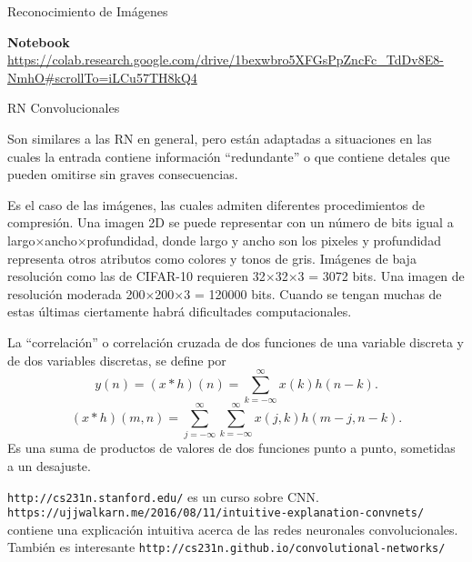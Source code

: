 \documentclass[10pd,hyperref={colorlinks=true}]{beamer}
\begin{document}

\begin{frame}{Reconocimiento de Im\'agenes}

 \vfill

\centerline{\textbf{Notebook} \url{https://colab.research.google.com/drive/1bexwbro5XFGsPpZncFc\_TdDv8E8-NmhO\#scrollTo=iLCu57TH8kQ4}}

 \vfill

 \end{frame}


 \begin{frame}{RN Convolucionales}

Son similares a las RN en general, pero est\'an adaptadas a situaciones 
en las cuales la entrada contiene informaci\'on ``redundante'' o que 
contiene detales que pueden omitirse sin graves consecuencias.

Es el caso de las im\'agenes, las cuales admiten diferentes 
procedimientos de compresi\'on. Una imagen 2D se puede representar con 
un n\'umero de bits igual a largo$\times$ancho$\times$profundidad, donde 
largo y ancho son los pixeles y profundidad representa otros atributos 
como colores y tonos de gris. Im\'agenes de baja resoluci\'on como las 
de CIFAR-10 requieren 32$\times$32$\times$3 = 3072 bits. Una imagen de 
resoluci\'on moderada 200$\times$200$\times$3 = 120000 bits. Cuando se 
tengan muchas de estas \'ultimas ciertamente habr\'a dificultades 
computacionales.

 \end{frame}


 \begin{frame}{}

La ``correlaci\'on'' o correlaci\'on cruzada de dos funciones de una 
variable discreta y de dos variables discretas, se define por
 $$
 y(n) = (x*h)(n) = \sum\limits_{k=-\infty}^\infty x(k)h(n-k).
 $$
 $$
 (x*h)(m,n) =
 \sum\limits_{j=-\infty}^\infty\sum\limits_{k=-\infty}^\infty
 x(j,k)h(m-j,n-k).
 $$
 Es una suma de productos de valores de dos funciones punto a punto, 
sometidas a un desajuste.

\texttt{http://cs231n.stanford.edu/} es un curso sobre CNN. 
\texttt{https://ujjwalkarn.me/2016/08/11/intuitive-explanation-convnets/} 
contiene una explicaci\'on intuitiva acerca de las redes neuronales 
convolucionales. Tambi\'en es interesante 
\texttt{http://cs231n.github.io/convolutional-networks/}

 \end{frame}
\end{document}

